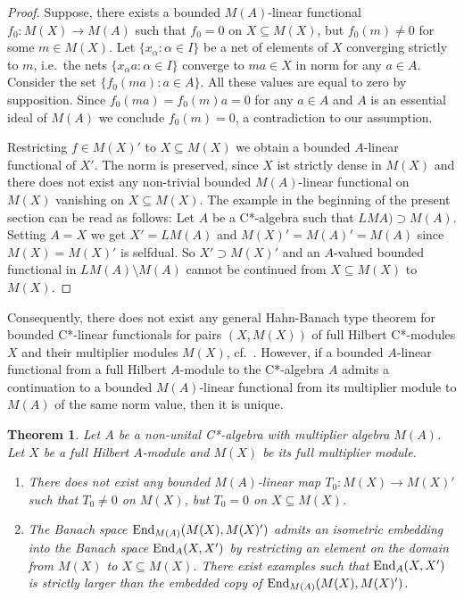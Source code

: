 \documentclass{amsart}
\newtheorem{thm}{Theorem}[section]
\theoremstyle{definition}
\begin{document}
\begin{proof}
Suppose, there exists a bounded $M(A)$-linear functional $f_0 : M(X) \to M(A)$ such that $f_0=0$ on $X \subseteq M(X)$, but $f_0(m) \neq 0$ for some $m \in M(X)$. Let $\{ x_\alpha: \alpha \in I\}$ be a net of elements of $X$ converging strictly to $m$, i.e.~the nets $\{ x_\alpha a: \alpha \in I\}$ converge to $ma \in X$ in norm for any $a \in A$. Consider the set $\{ f_0(ma) : a \in A \}$. All these values are equal to zero by supposition. Since  $f_0(ma) = f_0(m) a = 0$ for any $a \in A$ and $A$ is an essential ideal of $M(A)$ we conclude $f_0(m) =0$, a contradiction to our assumption.

Restricting $f \in M(X)'$ to $X \subseteq M(X)$ we obtain a bounded $A$-linear functional of $X'$. The norm is preserved, since $X$ ist strictly dense in $M(X)$ and there does not exist any non-trivial bounded $M(A)$-linear functional on $M(X)$ vanishing on $X \subseteq M(X)$. The example in the beginning of the present section can be read as follows: Let $A$ be a C*-algebra such that $LMA) \supset M(A)$. Setting $A=X$ we get $X'=LM(A)$ and $M(X)'=M(A)'= M(A)$ since $M(X)=M(X)'$ is selfdual. So $X' \supset M(X)'$ and an $A$-valued bounded functional in $LM(A) \setminus M(A)$ cannot be continued from $X \subseteq M(X)$ to $M(X)$.
\end{proof}

Consequently, there does not exist any general Hahn-Banach type theorem for bounded C*-linear functionals for pairs $(X, M(X))$ of full Hilbert C*-modules $X$ and their multiplier modules $M(X)$, cf.~\cite{F_2002,F_2024}. However, if a bounded $A$-linear functional from a full Hilbert $A$-module to the C*-algebra $A$ admits a continuation to a bounded $M(A)$-linear functional from its multiplier module to $M(A)$ of the same norm value, then it is unique. 


\begin{thm} 
Let $A$ be a non-unital C*-algebra with multiplier algebra $M(A)$. Let $X$ be a full Hilbert $A$-module and $M(X)$ be its full multiplier module.
\begin{enumerate}
  \item There does not exist any bounded $M(A)$-linear map $T_0: M(X) \to M(X)'$ such that $T_0 \neq 0$ on $M(X)$, but $T_0 =0$ on $X \subseteq M(X)$.
  \item The Banach space ${\rm End}_{M(A)}(M(X),M(X)')$ admits an isometric embedding into the Banach space ${\rm End}_A(X,X')$ by restricting an element on the domain from $M(X)$ to $X\subseteq M(X)$. There exist examples such that ${\rm End}_A(X,X')$  is strictly larger than the embedded copy of 
\linebreak[4]
${\rm End}_{M(A)}(M(X),M(X)')$.
\end{enumerate}
\end{thm}
\end{document}
